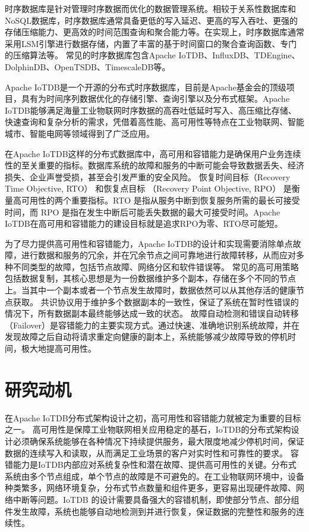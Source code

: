 时序数据库\cite{naqvi2017timeseriesdb}是针对管理时序数据而优化的数据管理系统。相较于关系性数据库\cite{codd2007relational}和NoSQL数据库\cite{han2011surveynosql}，时序数据库通常具备更低的写入延迟、更高的写入吞吐、更强的存储压缩能力、更高效的时间范围查询和聚合能力等。在实现上，时序数据库通常采用LSM\cite{o1996lsmtree}引擎进行数据存储，内置了丰富的基于时间窗口的聚合查询函数、专门的压缩算法等。
常见的时序数据库包含Apache IoTDB\cite{wang2020iotdb}、InfluxDB\cite{shahid2019influxdb}、TDEngine\cite{tdengine_website}、DolphinDB\cite{dolphindb_website}、OpenTSDB\cite{opentsdb_website}、TimescaleDB\cite{timescale_website}等。

Apache IoTDB是一个开源的分布式时序数据库，目前是Apache基金会的顶级项目，具有为时间序列数据优化的存储引擎、查询引擎以及分布式框架。Apache IoTDB能够满足海量工业物联网时序数据的高吞吐低延时写入、高压缩比存储、快速查询和复杂分析的需求，凭借着高性能、高可用性等特点在工业物联网、智能城市、智能电网等领域得到了广泛应用。

在Apache IoTDB这样的分布式数据库中，高可用和容错能力\cite{gray2002high}是确保用户业务连续性的至关重要的指标。数据库系统的故障和服务的中断可能会导致数据丢失、经济损失、企业声誉受损，甚至会引发严重的安全风险。
恢复时间目标（Recovery Time Objective, RTO） 和恢复点目标 （Recovery Point Objective, RPO） \cite{suguna2014overview}是衡量高可用性的两个重要指标。RTO 是指从服务中断到恢复服务所需的最长可接受时间，而 RPO 是指在发生中断后可能丢失数据的最大可接受时间。Apache IoTDB在高可用和容错能力的建设目标就是追求RPO为零、RTO尽可能短。

为了尽力提供高可用性和容错能力，Apache IoTDB的设计和实现需要消除单点故障，进行数据和服务的冗余，并在冗余节点之间可靠地进行故障转移，从而应对多种不同类型的故障，包括节点故障、网络分区和软件错误等。
常见的高可用策略包括数据复制\cite{milani2017systematic}，其核心思想是为一份数据维护多个副本，存储在多个不同的节点上。当其中一个副本或者一个节点发生故障时，数据依然可以从其他存活的健康节点获取。
共识协议用于维护多个数据副本的一致性，保证了系统在暂时性错误的情况下，所有数据副本最终能够达成一致的状态。
故障自动检测和错误自动转移（Failover）\cite{mohammed2017failover}是容错能力的主要实现方式。通过快速、准确地识别系统故障，并在发现故障之后自动将请求重定向健康的副本上，系统能够减少故障导致的停机时间，极大地提高可用性。


\section{研究动机}\label{1-motivation}

在Apache IoTDB分布式架构设计之初，高可用性和容错能力就被定为重要的目标之一。
高可用性是保障工业物联网相关应用稳定的基石，IoTDB的分布式架构设计必须确保系统能够在各种情况下持续提供服务，最大限度地减少停机时间，保证数据的连续写入和读取，从而满足工业场景的客户对实时性和可靠性的要求。
容错能力是IoTDB内部应对系统复杂性和潜在故障、提供高可用性的关键。分布式系统由多个节点组成，单个节点的故障是不可避免的。在工业物联网环境中，设备种类繁多，网络环境复杂，分布式节点数量和组件更多，更容易出现硬件故障、网络中断等问题。IoTDB 的设计需要具备强大的容错机制，即使部分节点、部分组件发生故障，系统也能够自动地检测到并进行恢复，保证数据的完整性和服务的连续性。


